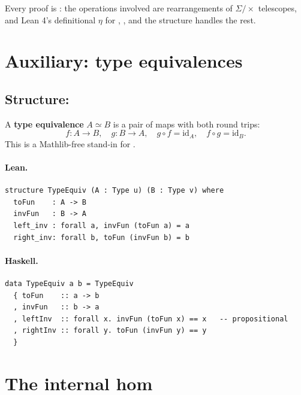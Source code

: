 \documentclass[11pt,a4paper]{article}
\begin{document}
Every proof is : the operations involved are rearrangements of
$\Sigma/\times$ telescopes, and Lean 4's definitional $\eta$ for ,
, and the  structure handles the rest.

\section{Auxiliary: type equivalences}

\subsection{Structure: }

\begin{defn}
A \textbf{type equivalence} $A \simeq B$ is a pair of maps with both round trips:
\[
  f : A \to B, \quad g : B \to A, \quad
  g \circ f = \mathrm{id}_A, \quad f \circ g = \mathrm{id}_B.
\]
This is a Mathlib-free stand-in for .
\end{defn}

\paragraph{Lean.}
\begin{lstlisting}[style=lean]
structure TypeEquiv (A : Type u) (B : Type v) where
  toFun    : A -> B
  invFun   : B -> A
  left_inv : forall a, invFun (toFun a) = a
  right_inv: forall b, toFun (invFun b) = b
\end{lstlisting}

\paragraph{Haskell.}
\begin{lstlisting}[style=haskell]
data TypeEquiv a b = TypeEquiv
  { toFun    :: a -> b
  , invFun   :: b -> a
  , leftInv  :: forall x. invFun (toFun x) == x   -- propositional
  , rightInv :: forall y. toFun (invFun y) == y
  }
\end{lstlisting}


\section{The internal hom}
\end{document}
